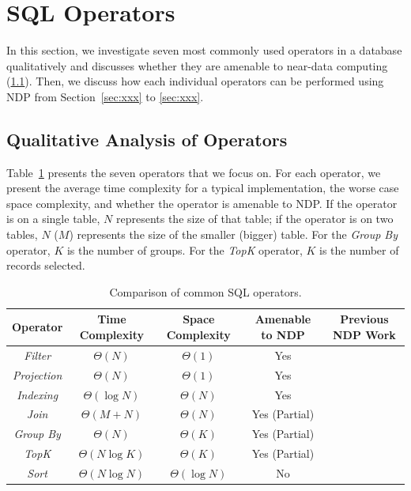 \documentclass{article}
\newcommand{\filter}{\textit{Filter}\xspace}
\newcommand{\projection}{\textit{Projection}\xspace}
\newcommand{\join}{\textit{Join}\xspace}
\newcommand{\sort}{\textit{Sort}\xspace}
\newcommand{\indexing}{\textit{Indexing}\xspace}
\newcommand{\groupby}{\textit{Group By}\xspace}
\newcommand{\topk}{\textit{TopK}\xspace}
\begin{document}
\section{SQL Operators}

In this section, we investigate seven most commonly used operators in a database qualitatively and discusses whether they are amenable to near-data computing (\cref{sec:analysis}). Then, we discuss how each individual operators can be performed using NDP from Section~\ref{sec:xxx} to \ref{sec:xxx}.

\subsection{Qualitative Analysis of Operators} \label{sec:analysis}

Table~\ref{tab:operators} presents the seven operators that we focus on. For each operator, we present the average time complexity for a typical implementation, the worse case space complexity, and whether the operator is amenable to NDP.
If the operator is on a single table, $N$ represents the size of that table; if the operator is on two tables, $N$ ($M$) represents the size of the smaller (bigger) table. 
For the \textit{Group By} operator, $K$ is the number of groups. For the \textit{TopK} operator, $K$ is the number of records selected. 

\begin{table}
\centering 
\begin{tabular}{ |c|c|c|c|c| } 
 \hline
 Operator       & Time Complexity & Space Complexity  & Amenable to NDP & Previous NDP Work \\ \hline
 \filter        & $\Theta(N)$     & $\Theta(1)$       & Yes             & \cite{netezza, exadata} \\ \hline
 \projection    & $\Theta(N)$     & $\Theta(1)$       & Yes             & \cite{netezza, exadata} \\\hline
 \indexing      & $\Theta(\log{N})$ & $\Theta(N)$     & Yes             & \\ \hline
 \join          & $\Theta(M + N)$ & $\Theta(N)$       & Yes (Partial)   & \cite{} \\ \hline
 \groupby       & $\Theta(N)$     & $\Theta(K)$       & Yes (Partial)   & \cite{ibex, jafar} \\ \hline
 \topk          & $\Theta(N\log{K})$ & $\Theta(K)$    & Yes (Partial)   & \\ \hline
 \sort          & $\Theta(N\log{N})$ & $\Theta(\log{N})$ & No           & \\ \hline
\end{tabular}
\caption{Comparison of common SQL operators.}
\label{tab:operators}
\end{table}
\end{document}
